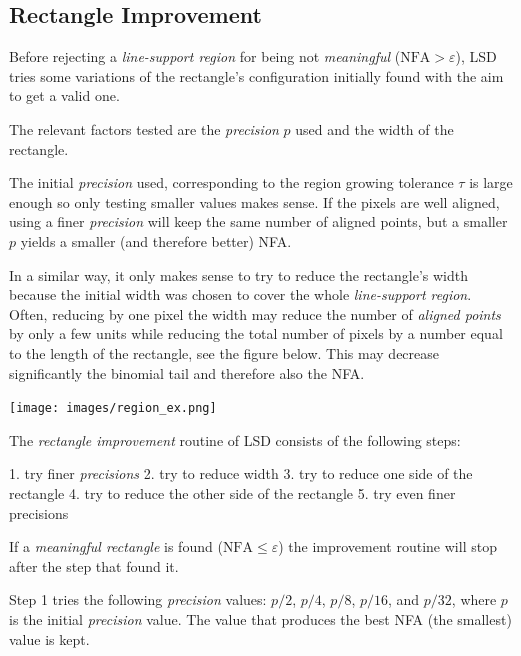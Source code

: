 \documentclass{ipol}
\begin{document}

\subsection{Rectangle Improvement}

Before rejecting a \emph{line-support region} for being
not \emph{meaningful} ($\textrm{NFA}>\varepsilon$), LSD tries some
variations of the rectangle's configuration initially found with the
aim to get a valid one.

The relevant factors tested are the \emph{precision} $p$ used and the
width of the rectangle.

The initial \emph{precision} used, corresponding to the region growing
tolerance $\tau$ is large enough so only testing smaller values makes
sense. If the pixels are well aligned, using a finer \emph{precision}
will keep the same number of aligned points, but a smaller $p$ yields
a smaller (and therefore better) NFA.

In a similar way, it only makes sense to try to reduce the rectangle's
width because the initial width was chosen to cover the whole
\emph{line-support region}. Often, reducing by one pixel the width may
reduce the number of \emph{aligned points} by only a few units while
reducing the total number of pixels by a number equal to the length of
the rectangle, see the figure below. This may decrease significantly
the binomial tail and therefore also the NFA.

\begin{center}
\texttt{[image: images/region\_ex.png]}
\end{center}

The \emph{rectangle improvement} routine of LSD consists of the
following steps:

1. try finer \emph{precisions}
2. try to reduce width
3. try to reduce one side of the rectangle
4. try to reduce the other side of the rectangle
5. try even finer precisions

If a \emph{meaningful rectangle} is found
($\textrm{NFA}\leq\varepsilon$) the improvement routine will stop
after the step that found it.

Step 1 tries the following \emph{precision} values: $p/2$, $p/4$,
$p/8$, $p/16$, and $p/32$, where $p$ is the initial \emph{precision}
value. The value that produces the best NFA (the smallest) value is
kept.
\end{document}
